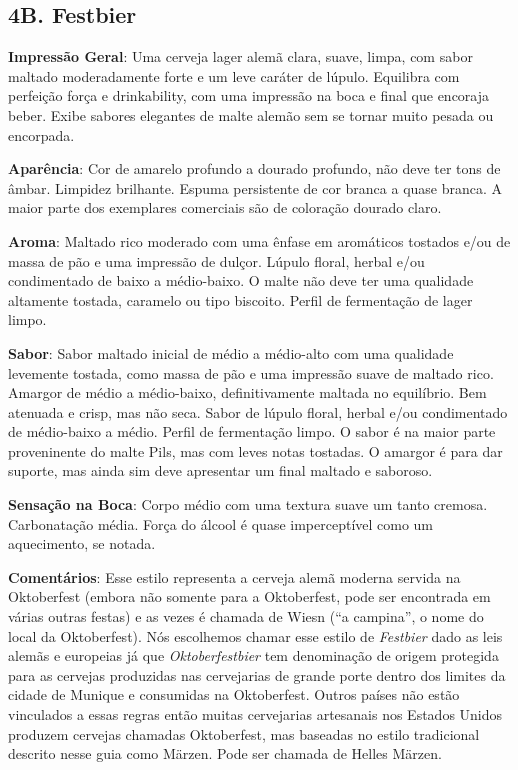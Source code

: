 \subsection*{4B. Festbier}

\textbf{Impressão Geral}: Uma cerveja lager alemã clara, suave, limpa, com sabor maltado moderadamente forte e um leve caráter de lúpulo. Equilibra com perfeição força e drinkability, com uma impressão na boca e final que encoraja beber. Exibe sabores elegantes de malte alemão sem se tornar muito pesada ou encorpada.

\textbf{Aparência}: Cor de amarelo profundo a dourado profundo, não deve ter tons de âmbar. Limpidez brilhante. Espuma persistente de cor branca a quase branca. A maior parte dos exemplares comerciais são de coloração dourado claro.

\textbf{Aroma}: Maltado rico moderado com uma ênfase em aromáticos tostados e/ou de massa de pão e uma impressão de dulçor. Lúpulo floral, herbal e/ou condimentado de baixo a médio-baixo. O malte não deve ter uma qualidade altamente tostada, caramelo ou tipo biscoito. Perfil de fermentação de lager limpo.

\textbf{Sabor}: Sabor maltado inicial de médio a médio-alto com uma qualidade levemente tostada, como massa de pão e uma impressão suave de maltado rico. Amargor de médio a médio-baixo, definitivamente maltada no equilíbrio. Bem atenuada e crisp, mas não seca. Sabor de lúpulo floral, herbal e/ou condimentado de médio-baixo a médio. Perfil de fermentação limpo. O sabor é na maior parte proveninente do malte Pils, mas com leves notas tostadas. O amargor é para dar suporte, mas ainda sim deve apresentar um final maltado e saboroso.

\textbf{Sensação na Boca}: Corpo médio com uma textura suave um tanto cremosa. Carbonatação média. Força do álcool é quase imperceptível como um aquecimento, se notada.

\textbf{Comentários}: Esse estilo representa a cerveja alemã moderna servida na Oktoberfest (embora não somente para a Oktoberfest, pode ser encontrada em várias outras festas) e as vezes é chamada de Wiesn (“a campina”, o nome do local da Oktoberfest). Nós escolhemos chamar esse estilo de \textit{Festbier} dado as leis alemãs e europeias já que \textit{Oktoberfestbier} tem denominação de origem protegida para as cervejas produzidas nas cervejarias de grande porte dentro dos limites da cidade de Munique e consumidas na Oktoberfest. Outros países não estão vinculados a essas regras então muitas cervejarias artesanais nos Estados Unidos produzem cervejas chamadas Oktoberfest, mas baseadas no estilo tradicional descrito nesse guia como Märzen. Pode ser chamada de Helles Märzen.

